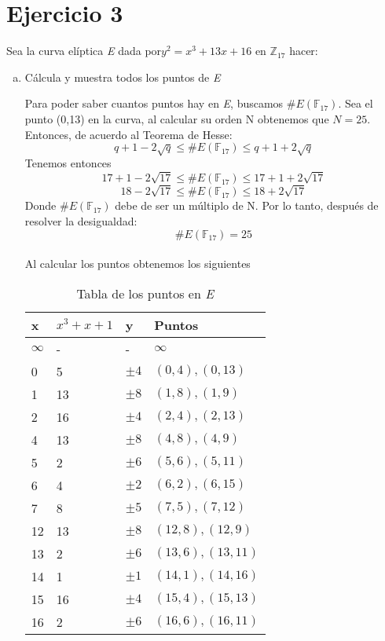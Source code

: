 \documentclass[12pt, letterpaper]{article}
\begin{document}
\section*{Ejercicio 3}
Sea la curva elíptica \textit{E} dada por$y^2=x^3+13x+16$ en  $\mathbb{Z}_{17}$ hacer:
\begin{enumerate}[a)]
\item Cálcula y muestra todos los puntos de \textit{E}

Para poder saber cuantos puntos hay en \textit{E}, buscamos $\#E(\mathbb{F}_{17})$.
Sea el punto (0,13) en la curva, al calcular su orden N obtenemos que $N=25$. Entonces, de acuerdo al Teorema de Hesse:
\[
q + 1 - 2\sqrt{ q } \leq \#E(\mathbb{F}_{17}) \leq q + 1 + 2\sqrt{ q }
\]
Tenemos entonces
\[
17 + 1 - 2\sqrt{ 17 } \leq \#E(\mathbb{F}_{17}) \leq 17 + 1 + 2\sqrt{ 17 }
\]
\[
18 - 2\sqrt{ 17 } \leq \#E(\mathbb{F}_{17}) \leq 18 + 2\sqrt{ 17 }
\]
Donde $\#E(\mathbb{F}_{17})$ debe de ser un múltiplo de N. Por lo tanto, después de resolver la desigualdad:
\[
\#E(\mathbb{F}_{17})=25
\]
\\
Al calcular los puntos obtenemos los siguientes
\begin{table}[htbp]
\begin{center}
\begin{tabular}{|l|l|l|l|}
\hline
x & $x^3+x+1$ & y & Puntos \\
\hline \hline
$\infty$ & - & - & $\infty$\\ \hline
0 & 5 & $\pm4$ & $(0,4), (0,13)$ \\ \hline
1 & 13 & $\pm8$ & $(1,8), (1,9)$\\ \hline
2 & 16 & $\pm4$ & $(2,4), (2,13)$\\ \hline
4 & 13 & $\pm8$& $(4,8), (4,9)$\\ \hline
5 & 2 & $\pm6$ & $(5,6), (5,11)$\\ \hline
6 & 4 & $\pm2$ & $(6,2), (6,15)$\\ \hline
7 & 8 & $\pm5$  & $(7,5), (7,12)$\\ \hline
12 & 13 & $\pm8$ & $(12,8), (12,9)$\\ \hline
13 & 2 & $\pm6$& $(13,6), (13,11)$\\ \hline
14 & 1 & $\pm1$& $(14,1), (14,16)$\\ \hline
15 & 16 & $\pm4$ & $(15,4), (15,13)$\\ \hline
16 & 2 & $\pm6 $& $(16,6), (16,11)$\\ \hline
\end{tabular}
\caption{Tabla de los puntos en \textit{E}}
\label{tabla:sencilla}

\end{center}
\end{table}
\end{enumerate}
\end{document}
